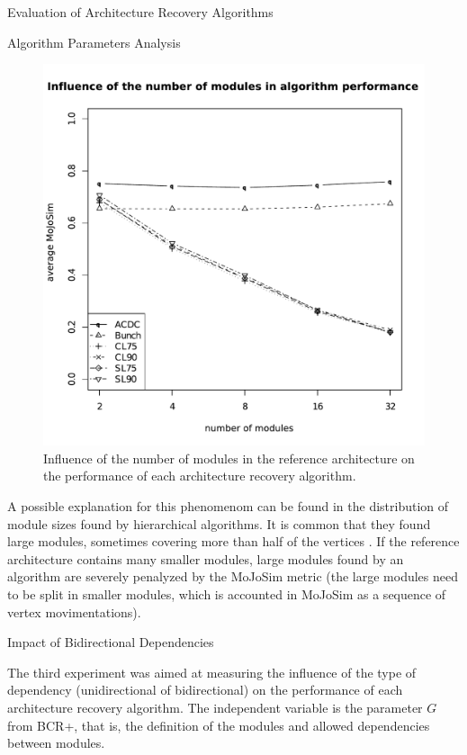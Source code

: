 \documentclass[11pt,twocolumn,a4paper,english]{article}
\begin{document}
\begin{section}{Evaluation of Architecture Recovery Algorithms}
\begin{subsection}{Algorithm Parameters Analysis}
	\begin{figure}[htbp]
		\centering
			\includegraphics[scale=0.5]{figures/exp-number-modules}
		\caption{Influence of the number of modules in the reference architecture on the performance of each architecture recovery algorithm.}
		\label{fig:exp-number-modules}
	\end{figure}
	
	A possible explanation for this phenomenom can be found in the distribution of module sizes found by hierarchical algorithms. It is common that they found large modules, sometimes covering more than half of the vertices \cite{Wu2005}. If the reference architecture contains many smaller modules, large modules found by an algorithm are severely penalyzed by the MoJoSim metric (the large modules need to be split in smaller modules, which is accounted in MoJoSim as a sequence of vertex movimentations).
	
\end{subsection}

\begin{subsection}{Impact of Bidirectional Dependencies}
	
	The third experiment was aimed at measuring the influence of the type of dependency (unidirectional of bidirectional) on the performance of each architecture recovery algorithm. The independent variable is the parameter $G$ from BCR+, that is, the definition of the modules and allowed dependencies between modules.
	

\end{subsection}
\end{section}
\end{document}
